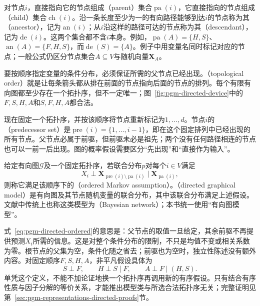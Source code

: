 对节点$i$，直接指向它的节点组成（parent）集合$\operatorname{pa}(i)$，它直接指向的节点组成（child）集合$\operatorname{ch}(i)$。沿一条长度至少为一的有向路径能够到达$i$的节点称为其（ancestor），记为$\operatorname{an}(i)$；从$i$沿这样的路径可达的节点称为其（descendant），记为$\operatorname{de}(i)$。这两个集合都不含$i$本身。例如，$\operatorname{pa}(A)=\{H,S\}$、$\operatorname{an}(A)=\{F,H,S\}$，而$\operatorname{de}(S)=\{A\}$。例子中用变量名同时标记对应的节点；一般公式仍区分节点集合$A\subseteq V$与随机向量$\bm{X}_A$。

要按顺序指定变量的条件分布，必须保证所需的父节点已经出现。（topological order）就是让每条箭头都从排在前面的节点指向后面的节点的排列。每个有限有向图都至少存在一个拓扑序，但不一定唯一；图~\ref{fig:pgm-directed-device}中的$F,S,H,A$和$S,F,H,A$都合法。

现在固定一个拓扑序，并按该顺序将节点重新标记为$1,\ldots,d$。节点$i$的（predecessor set）是$\operatorname{pre}(i)=\{1,\ldots,i-1\}$，即在这个固定排列中已经出现的所有节点。父节点必属于前驱，但前驱未必是祖先；两个没有任何路径相连的节点也可以一前一后出现。图的概率假设需要区分“先出现”和“直接作为输入”。

\begin{definition}[有序Markov假设与有向图模型]
  \label{def:pgm-directed-ordered}
  给定有向图$\mathcal{G}$及一个固定拓扑序，若联合分布$p$对每个$i\in V$满足
  \begin{equation}
    X_i\perp
    \bm{X}_{\operatorname{pre}(i)\setminus\operatorname{pa}(i)}
    \mid\bm{X}_{\operatorname{pa}(i)},
    \label{eq:pgm-directed-ordered}
  \end{equation}
  则称它满足该顺序下的（ordered Markov assumption）。（directed graphical model）是有向图及其节点随机变量的联合分布，其中该联合分布满足上述假设。文献中传统上也称这类模型为（Bayesian network）；本书统一使用“有向图模型”。
\end{definition}

式~\eqref{eq:pgm-directed-ordered}的意思是：父节点的取值一旦给定，其余前驱不再提供预测$X_i$所需的信息。这是对整个条件分布的限制，不只是均值不变或相关系数为零。根节点的父集为空，条件化随之省去；前驱也为空时，独立性陈述没有额外内容。对固定顺序$F,S,H,A$，非平凡假设具体为
\[
  S\perp F,\qquad H\perp S\mid F,\qquad A\perp F\mid(H,S).
\]
单凭这个定义，不能不加论证地换一个拓扑序再调用新的有序假设。只有结合有序性质与因子分解的等价关系，才能推出模型类与所选合法拓扑序无关；完整证明见第~\ref{sec:pgm-representations-directed-proofs}节。

